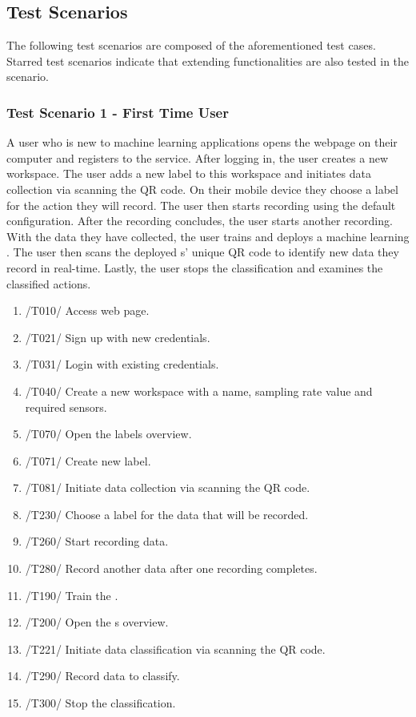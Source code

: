\subsection{Test Scenarios}
The following test scenarios are composed of the aforementioned test cases. Starred test scenarios indicate that extending functionalities are also tested in the scenario.
\subsubsection{Test Scenario 1 - First Time User}
A user who is new to machine learning applications opens the webpage on their computer and registers to the service. After logging in, the user creates a new workspace. The user adds a new label to this workspace and initiates data collection via scanning the QR code. On their mobile device they choose a label for the action they will record. The user then starts recording using the default configuration. After the recording concludes, the user starts another recording. With the data they have collected, the user trains and deploys a machine learning . The user then scans the deployed s' unique \gls{QR code} to identify new data they record in real-time. Lastly, the user stops the \gls{classification} and examines the classified actions.
\begin{enumerate}
    \item /T010/ Access web page.
    \item /T021/ Sign up with new credentials.
    \item /T031/ Login with existing credentials.
    \item /T040/ Create a new \gls{workspace} with a name, sampling rate value and required \glspl{sensor}.
    \item /T070/ Open the labels overview.
    \item /T071/ Create new label.
    \item /T081/ Initiate data collection via scanning the \gls{QR code}.
    \item /T230/ Choose a \gls{label} for the data that will be recorded.
    \item /T260/ Start recording data.
    \item /T280/ Record another data after one recording completes.
    \item /T190/ Train the .
    \item /T200/ Open the s overview.
    \item /T221/ Initiate data \gls{classification} via scanning the \gls{QR code}.
    \item /T290/ Record data to classify.
    \item /T300/ Stop the \gls{classification}.
\end{enumerate}
